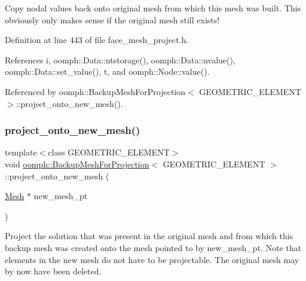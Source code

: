 Copy nodal values back onto original mesh from which this mesh was built. This obviously only makes sense if the original mesh still exists! 



Definition at line 443 of file face\+\_\+mesh\+\_\+project.\+h.



References i, oomph\+::\+Data\+::ntstorage(), oomph\+::\+Data\+::nvalue(), oomph\+::\+Data\+::set\+\_\+value(), t, and oomph\+::\+Node\+::value().



Referenced by oomph\+::\+Backup\+Mesh\+For\+Projection$<$ G\+E\+O\+M\+E\+T\+R\+I\+C\+\_\+\+E\+L\+E\+M\+E\+N\+T $>$\+::project\+\_\+onto\+\_\+new\+\_\+mesh().

\mbox{\label{classoomph_1_1BackupMeshForProjection_ab96a32a5934ef0edfbc50eb846cb3641}} 
\subsubsection{\texorpdfstring{project\+\_\+onto\+\_\+new\+\_\+mesh()}{project\_onto\_new\_mesh()}}
{\footnotesize\ttfamily template$<$class G\+E\+O\+M\+E\+T\+R\+I\+C\+\_\+\+E\+L\+E\+M\+E\+NT$>$ \\
void \hyperlink{classoomph_1_1BackupMeshForProjection}{oomph\+::\+Backup\+Mesh\+For\+Projection}$<$ G\+E\+O\+M\+E\+T\+R\+I\+C\+\_\+\+E\+L\+E\+M\+E\+NT $>$\+::project\+\_\+onto\+\_\+new\+\_\+mesh (\begin{DoxyParamCaption}\item[{\hyperlink{classoomph_1_1Mesh}{Mesh} $\ast$}]{new\+\_\+mesh\+\_\+pt }\end{DoxyParamCaption})\hspace{0.3cm}{\ttfamily [inline]}}



Project the solution that was present in the original mesh and from which this backup mesh was created onto the mesh pointed to by new\+\_\+mesh\+\_\+pt. Note that elements in the new mesh do not have to be projectable. The original mesh may by now have been deleted. 



